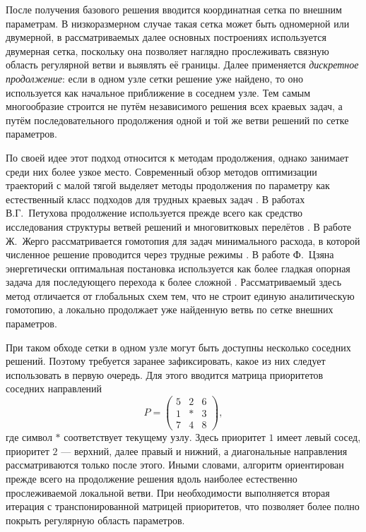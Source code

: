 После получения базового решения вводится координатная сетка по внешним параметрам. В низкоразмерном случае такая сетка может быть одномерной или двумерной, в рассматриваемых далее основных построениях используется двумерная сетка, поскольку она позволяет наглядно прослеживать связную область регулярной ветви и выявлять её границы. Далее применяется \textit{дискретное продолжение}: если в одном узле сетки решение уже найдено, то оно используется как начальное приближение в соседнем узле. Тем самым многообразие строится не путём независимого решения всех краевых задач, а путём последовательного продолжения одной и той же ветви решений по сетке параметров.

По своей идее этот подход относится к методам продолжения, однако занимает среди них более узкое место. Современный обзор методов оптимизации траекторий с малой тягой выделяет методы продолжения по параметру как естественный класс подходов для трудных краевых задач \cite{morante_survey_2021}. В работах В.Г.~Петухова продолжение используется прежде всего как средство исследования структуры ветвей решений и многовитковых перелётов \cite{petukhov_method_ru_2012}. В работе Ж.~Жерго рассматривается гомотопия для задач минимального расхода, в которой численное решение проводится через трудные режимы \cite{gergaud_homotopy_2006}. В работе Ф.~Цзяна энергетически оптимальная постановка используется как более гладкая опорная задача для последующего перехода к более сложной \cite{jiang_practical_2012}. Рассматриваемый здесь метод отличается от глобальных схем тем, что не строит единую аналитическую гомотопию, а локально продолжает уже найденную ветвь по сетке внешних параметров.

При таком обходе сетки в одном узле могут быть доступны несколько соседних решений. Поэтому требуется заранее зафиксировать, какое из них следует использовать в первую очередь. Для этого вводится матрица приоритетов соседних направлений
\begin{equation}
	P=
	\begin{pmatrix}
		5 & 2 & 6\\
		1 & * & 3\\
		7 & 4 & 8
	\end{pmatrix},
\end{equation}
где символ \(*\) соответствует текущему узлу. Здесь приоритет \(1\) имеет левый сосед, приоритет \(2\) --- верхний, далее правый и нижний, а диагональные направления рассматриваются только после этого. Иными словами, алгоритм ориентирован прежде всего на продолжение решения вдоль наиболее естественно прослеживаемой локальной ветви. При необходимости выполняется вторая итерация с транспонированной матрицей приоритетов, что позволяет более полно покрыть регулярную область параметров.

